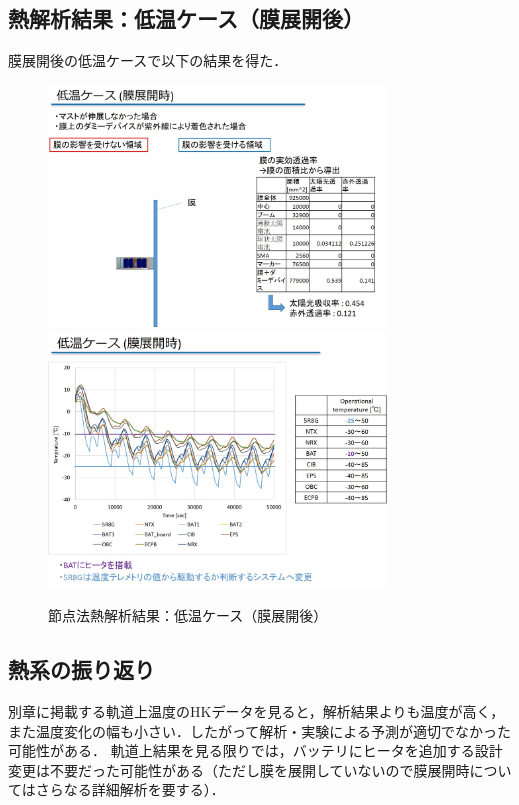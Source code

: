 \subsection{熱解析結果：低温ケース（膜展開後）}
膜展開後の低温ケースで以下の結果を得た．
\begin{figure}[H]
	\centering
	\includegraphics[width=0.8\textwidth]{03/fig/3-7-8.jpg}
	\includegraphics[width=0.8\textwidth]{03/fig/3-7-9.jpg}
	\caption{節点法熱解析結果：低温ケース（膜展開後）}
	\label{fig3-7-8}
\end{figure}

\subsection{熱系の振り返り}
別章に掲載する軌道上温度のHKデータを見ると，解析結果よりも温度が高く，また温度変化の幅も小さい．したがって解析・実験による予測が適切でなかった可能性がある．
軌道上結果を見る限りでは，バッテリにヒータを追加する設計変更は不要だった可能性がある（ただし膜を展開していないので膜展開時についてはさらなる詳細解析を要する）．
